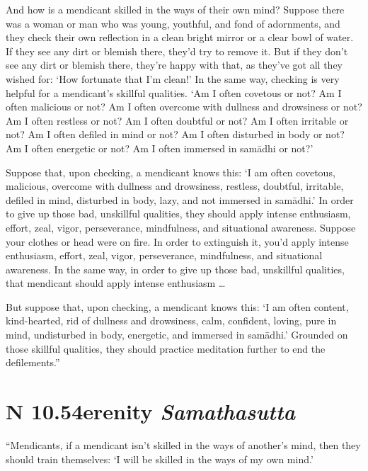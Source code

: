 \documentclass[12pt,openany]{book}%
\newcommand*{\suttatitleacronym}[1]{\smaller[2]{#1}\vspace*{.3em}}
\newcommand*{\suttatitletranslation}[1]{\linebreak{#1}}
\newcommand*{\suttatitleroot}[1]{\linebreak\smaller[2]\itshape{#1}}
\newcommand*{\tocacronym}[1]{\hspace*{-3.3em}{#1}\quad}
\newcommand*{\toctranslation}[1]{#1}
\newcommand*{\tocroot}[1]{(\textit{#1})}
\begin{document}
And how is a mendicant skilled in the ways of their own mind? Suppose there was a woman or man who was young, youthful, and fond of adornments, and they check their own reflection in a clean bright mirror or a clear bowl of water. If they see any dirt or blemish there, they’d try to remove it. But if they don’t see any dirt or blemish there, they’re happy with that, as they’ve got all they wished for: ‘How fortunate that I’m clean!’ In the same way, checking is very helpful for a mendicant’s skillful qualities. ‘Am I often covetous or not? Am I often malicious or not? Am I often overcome with dullness and drowsiness or not? Am I often restless or not? Am I often doubtful or not? Am I often irritable or not? Am I often defiled in mind or not? Am I often disturbed in body or not? Am I often energetic or not? Am I often immersed in \textsanskrit{samādhi} or not?’ 

Suppose that, upon checking, a mendicant knows this: ‘I am often covetous, malicious, overcome with dullness and drowsiness, restless, doubtful, irritable, defiled in mind, disturbed in body, lazy, and not immersed in \textsanskrit{samādhi}.’ In order to give up those bad, unskillful qualities, they should apply intense enthusiasm, effort, zeal, vigor, perseverance, mindfulness, and situational awareness. Suppose your clothes or head were on fire. In order to extinguish it, you’d apply intense enthusiasm, effort, zeal, vigor, perseverance, mindfulness, and situational awareness. In the same way, in order to give up those bad, unskillful qualities, that mendicant should apply intense enthusiasm … 

But suppose that, upon checking, a mendicant knows this: ‘I am often content, kind-hearted, rid of dullness and drowsiness, calm, confident, loving, pure in mind, undisturbed in body, energetic, and immersed in \textsanskrit{samādhi}.’ Grounded on those skillful qualities, they should practice meditation further to end the defilements.” 

%
\section*{{\suttatitleacronym AN 10.54}{\suttatitletranslation Serenity }{\suttatitleroot Samathasutta}}
\addcontentsline{toc}{section}{\tocacronym{AN 10.54} \toctranslation{Serenity } \tocroot{Samathasutta}}

“Mendicants, if a mendicant isn’t skilled in the ways of another’s mind, then they should train themselves: ‘I will be skilled in the ways of my own mind.’ 
\end{document}
